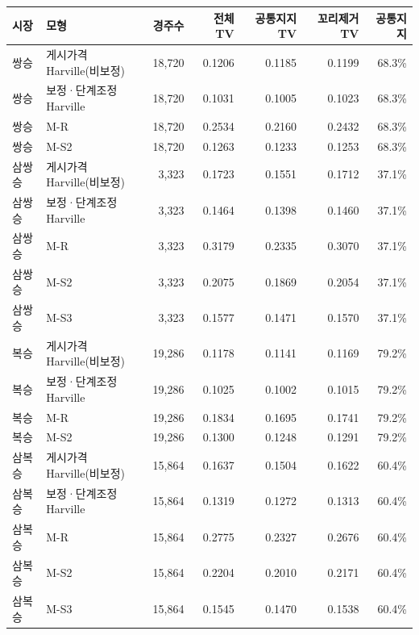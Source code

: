 \begin{tabular}{llrrrrr}
\toprule
시장 & 모형 & 경주수 & 전체 TV & 공통지지 TV & 꼬리제거 TV & 공통지지 \\
\midrule
쌍승 & 게시가격 Harville(비보정) & 18,720 & 0.1206 & 0.1185 & 0.1199 & 68.3\% \\
쌍승 & 보정·단계조정 Harville & 18,720 & 0.1031 & 0.1005 & 0.1023 & 68.3\% \\
쌍승 & M-R & 18,720 & 0.2534 & 0.2160 & 0.2432 & 68.3\% \\
쌍승 & M-S2 & 18,720 & 0.1263 & 0.1233 & 0.1253 & 68.3\% \\
\addlinespace
삼쌍승 & 게시가격 Harville(비보정) & 3,323 & 0.1723 & 0.1551 & 0.1712 & 37.1\% \\
삼쌍승 & 보정·단계조정 Harville & 3,323 & 0.1464 & 0.1398 & 0.1460 & 37.1\% \\
삼쌍승 & M-R & 3,323 & 0.3179 & 0.2335 & 0.3070 & 37.1\% \\
삼쌍승 & M-S2 & 3,323 & 0.2075 & 0.1869 & 0.2054 & 37.1\% \\
삼쌍승 & M-S3 & 3,323 & 0.1577 & 0.1471 & 0.1570 & 37.1\% \\
\addlinespace
복승 & 게시가격 Harville(비보정) & 19,286 & 0.1178 & 0.1141 & 0.1169 & 79.2\% \\
복승 & 보정·단계조정 Harville & 19,286 & 0.1025 & 0.1002 & 0.1015 & 79.2\% \\
복승 & M-R & 19,286 & 0.1834 & 0.1695 & 0.1741 & 79.2\% \\
복승 & M-S2 & 19,286 & 0.1300 & 0.1248 & 0.1291 & 79.2\% \\
\addlinespace
삼복승 & 게시가격 Harville(비보정) & 15,864 & 0.1637 & 0.1504 & 0.1622 & 60.4\% \\
삼복승 & 보정·단계조정 Harville & 15,864 & 0.1319 & 0.1272 & 0.1313 & 60.4\% \\
삼복승 & M-R & 15,864 & 0.2775 & 0.2327 & 0.2676 & 60.4\% \\
삼복승 & M-S2 & 15,864 & 0.2204 & 0.2010 & 0.2171 & 60.4\% \\
삼복승 & M-S3 & 15,864 & 0.1545 & 0.1470 & 0.1538 & 60.4\% \\
\bottomrule
\end{tabular}
